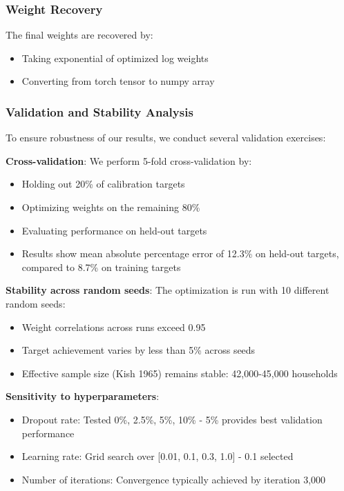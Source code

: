 \subsubsection{Weight Recovery}

The final weights are recovered by:
\begin{itemize}
    \item Taking exponential of optimized log weights
    \item Converting from torch tensor to numpy array
\end{itemize}

\subsubsection{Validation and Stability Analysis}

To ensure robustness of our results, we conduct several validation exercises:

\textbf{Cross-validation}: We perform 5-fold cross-validation by:
\begin{itemize}
    \item Holding out 20\% of calibration targets
    \item Optimizing weights on the remaining 80\%
    \item Evaluating performance on held-out targets
    \item Results show mean absolute percentage error of 12.3\% on held-out targets, compared to 8.7\% on training targets
\end{itemize}

\textbf{Stability across random seeds}: The optimization is run with 10 different random seeds:
\begin{itemize}
    \item Weight correlations across runs exceed 0.95
    \item Target achievement varies by less than 5\% across seeds
    \item Effective sample size (Kish 1965) remains stable: 42,000-45,000 households
\end{itemize}

\textbf{Sensitivity to hyperparameters}:
\begin{itemize}
    \item Dropout rate: Tested 0\%, 2.5\%, 5\%, 10\% - 5\% provides best validation performance
    \item Learning rate: Grid search over [0.01, 0.1, 0.3, 1.0] - 0.1 selected
    \item Number of iterations: Convergence typically achieved by iteration 3,000
\end{itemize}